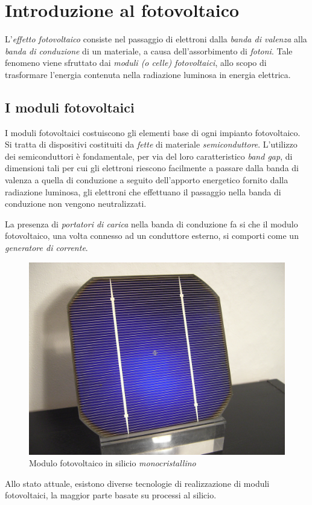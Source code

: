 \clearpage{\pagestyle{empty}\cleardoublepage}
\chapter{Introduzione al fotovoltaico}
%
L'\emph{effetto fotovoltaico} consiste nel passaggio di elettroni 
dalla \emph{banda di valenza} alla \emph{banda di conduzione} di 
un materiale, a causa dell'assorbimento di \emph{fotoni}. 
%
Tale fenomeno viene sfruttato dai \emph{moduli (o celle) fotovoltaici}, 
allo scopo di trasformare l'energia contenuta nella radiazione luminosa 
in energia elettrica.
%

%
\section{I moduli fotovoltaici}
I moduli fotovoltaici costuiscono gli elementi base di ogni impianto
fotovoltaico. Si tratta di dispositivi costituiti da \emph{fette} di 
materiale \emph{semiconduttore}. L'utilizzo dei semiconduttori \`e 
fondamentale, per via del loro caratteristico \emph{band gap}, di 
dimensioni tali per cui  gli elettroni riescono facilmente 
a passare dalla banda di valenza a quella di conduzione a seguito 
dell'apporto energetico fornito dalla radiazione luminosa,  
gli elettroni che effettuano il passaggio nella banda di conduzione 
non vengono neutralizzati.
%

%
La presenza di \emph{portatori di carica} nella banda di conduzione 
fa si che il modulo fotovoltaico, una volta connesso ad un 
conduttore esterno, si comporti come un 
\emph{generatore di corrente}\cite{bellini09}.
%
\begin{figure}[!h]
\centering
\includegraphics[width=350pt]{img/modulo-fotovoltaico.jpg}
\caption{Modulo fotovoltaico in silicio \emph{monocristallino}}
\end{figure}
%
Allo stato attuale, esistono diverse tecnologie di realizzazione di 
moduli fotovoltaici, la maggior parte basate su processi al silicio.









